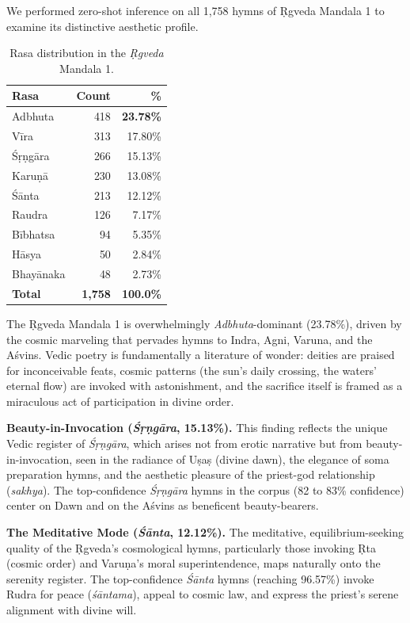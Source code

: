 \documentclass[11pt]{article}
\begin{document}
We performed zero-shot inference on all 1,758 hymns of \d Rgveda Mandala 1 to examine its distinctive aesthetic profile.

\begin{table}[htbp]
\centering
\small
\caption{Rasa distribution in the \textit{\d Rgveda} Mandala 1.}
\label{tab:rigveda_dist}
\begin{tabular}{lrr}
\toprule
Rasa & Count & \% \\
\midrule
Adbhuta   & 418 & \textbf{23.78\%} \\
V\=ira     & 313 & 17.80\% \\
Ś\d r\d ng\=ara & 266 & 15.13\% \\
Karu\d n\=a & 230 & 13.08\% \\
Ś\=anta   & 213 & 12.12\% \\
Raudra    & 126 & 7.17\%  \\
B\=ibhatsa &  94 & 5.35\%  \\
H\=asya   &  50 & 2.84\%  \\
Bhay\=anaka & 48 & 2.73\%  \\
\midrule
\textbf{Total} & \textbf{1,758} & \textbf{100.0\%} \\
\bottomrule
\end{tabular}
\end{table}

The \d Rgveda Mandala 1 is overwhelmingly \textit{Adbhuta}-dominant (23.78\%), driven by the cosmic marveling that pervades hymns to Indra, Agni, Varuna, and the Aśvins. Vedic poetry is fundamentally a literature of wonder: deities are praised for inconceivable feats, cosmic patterns (the sun's daily crossing, the waters' eternal flow) are invoked with astonishment, and the sacrifice itself is framed as a miraculous act of participation in divine order.

\textbf{Beauty-in-Invocation (\textit{Ś\d r\d ng\=ara}, 15.13\%).} This finding reflects the unique Vedic register of \textit{Ś\d r\d ng\=ara}, which arises not from erotic narrative but from beauty-in-invocation, seen in the radiance of U\d sa\d s (divine dawn), the elegance of soma preparation hymns, and the aesthetic pleasure of the priest-god relationship (\textit{sakhya}). The top-confidence \textit{Ś\d r\d ng\=ara} hymns in the corpus (82 to 83\% confidence) center on Dawn and on the Aśvins as beneficent beauty-bearers.

\textbf{The Meditative Mode (\textit{Ś\=anta}, 12.12\%).} The meditative, equilibrium-seeking quality of the \d Rgveda's cosmological hymns, particularly those invoking \d Rta (cosmic order) and Varu\d na's moral superintendence, maps naturally onto the serenity register. The top-confidence \textit{Ś\=anta} hymns (reaching 96.57\%) invoke Rudra for peace (\textit{ś\=antama}), appeal to cosmic law, and express the priest's serene alignment with divine will.
\end{document}
